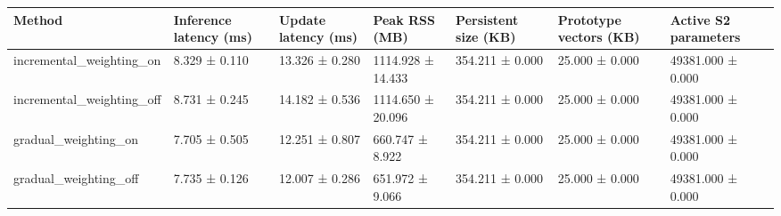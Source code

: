\begin{tabular}{lllllll}
\toprule
Method & Inference latency (ms) & Update latency (ms) & Peak RSS (MB) & Persistent size (KB) & Prototype vectors (KB) & Active S2 parameters \\
\midrule
incremental\_weighting\_on & 8.329 ± 0.110 & 13.326 ± 0.280 & 1114.928 ± 14.433 & 354.211 ± 0.000 & 25.000 ± 0.000 & 49381.000 ± 0.000 \\
incremental\_weighting\_off & 8.731 ± 0.245 & 14.182 ± 0.536 & 1114.650 ± 20.096 & 354.211 ± 0.000 & 25.000 ± 0.000 & 49381.000 ± 0.000 \\
gradual\_weighting\_on & 7.705 ± 0.505 & 12.251 ± 0.807 & 660.747 ± 8.922 & 354.211 ± 0.000 & 25.000 ± 0.000 & 49381.000 ± 0.000 \\
gradual\_weighting\_off & 7.735 ± 0.126 & 12.007 ± 0.286 & 651.972 ± 9.066 & 354.211 ± 0.000 & 25.000 ± 0.000 & 49381.000 ± 0.000 \\
\bottomrule
\end{tabular}
